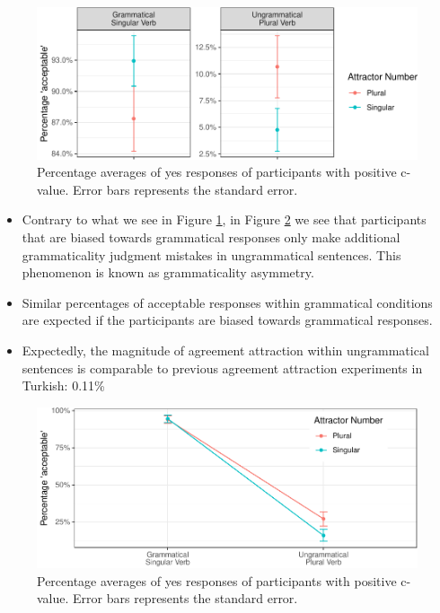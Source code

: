 \documentclass[
  10pt,
  english,
  doc,floatsintext]{apa6}
\providecommand{\tightlist}{%
  \setlength{\itemsep}{0pt}\setlength{\parskip}{0pt}}
\begin{document}
\begin{figure}
\centering
\includegraphics{paperdraft_files/figure-latex/UngBiasResponse-1.pdf}
\caption{\label{fig:UngBiasResponse}Percentage averages of yes responses of participants with positive c-value. Error bars represents the standard error.}
\end{figure}

\begin{itemize}
\tightlist
\item
  Contrary to what we see in Figure \ref{fig:UngBiasResponse}, in Figure \ref{fig:GBiasResponse} we see that participants that are biased towards grammatical responses only make additional grammaticality judgment mistakes in ungrammatical sentences. This phenomenon is known as grammaticality asymmetry.
\item
  Similar percentages of acceptable responses within grammatical conditions are expected if the participants are biased towards grammatical responses.
\item
  Expectedly, the magnitude of agreement attraction within ungrammatical sentences is comparable to previous agreement attraction experiments in Turkish: 0.11\%
\end{itemize}

\begin{figure}
\centering
\includegraphics{paperdraft_files/figure-latex/GBiasResponse-1.pdf}
\caption{\label{fig:GBiasResponse}Percentage averages of yes responses of participants with positive c-value. Error bars represents the standard error.}
\end{figure}
\end{document}
